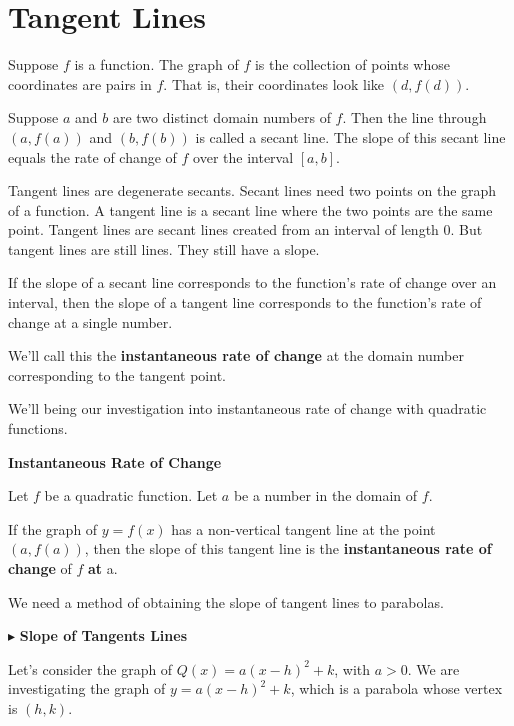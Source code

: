 \documentclass{ximera}
\begin{document}
\section{Tangent Lines}

Suppose $f$ is a function.  The graph of $f$ is the collection of points whose coordinates are pairs in $f$.  That is, their coordinates look like $(d, f(d))$.

Suppose $a$ and $b$ are two distinct domain numbers of $f$.  Then the line through $(a, f(a))$ and $(b, f(b))$ is called a secant line.  The slope of this secant line equals the rate of change of $f$ over the interval $[a, b]$.

Tangent lines are degenerate secants. Secant lines need two points on the graph of a function.  A tangent line is a secant line where the two points are the same point. Tangent lines are secant lines created from an interval of length $0$.  But tangent lines are still lines.  They still have a slope.


If the slope of a secant line corresponds to the function's rate of change over an interval, then the slope of a tangent line corresponds to the function's rate of change at a single number.


We'll call this the \textbf{\textcolor{purple!85!blue}{instantaneous rate of change}} at the domain number corresponding to the tangent point.

We'll being our investigation into instantaneous rate of change with quadratic functions. \\


\begin{definition} \textbf{\textcolor{green!50!black}{Instantaneous Rate of Change}}  


Let $f$ be a quadratic function. Let $a$ be a number in the domain of $f$.

If the graph of $y = f(x)$ has a non-vertical tangent line at the point $(a, f(a))$, then the slope of this tangent line is the \textbf{instantaneous rate of change} of $f$ \textbf{at} a.


\end{definition}

We need a method of obtaining the slope of tangent lines to parabolas.


$\blacktriangleright$ \textbf{Slope of Tangents Lines}





Let's consider the graph of $Q(x) = a (x - h)^2 + k$, with $a > 0$. We are investigating the graph of $y = a (x - h)^2 + k$, which is a parabola whose vertex is $(h, k)$. \\
\end{document}
